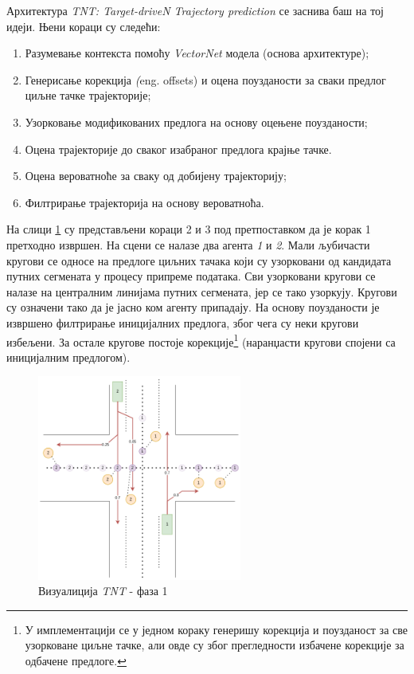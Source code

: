 \documentclass[11pt,oneside]{memoir}
\begin{document}
Архитектура \textit{TNT: Target-driveN Trajectory prediction} \cite{tnt} се заснива баш на тој идеји. Њени кораци су следећи:
\begin{enumerate}
  \item Разумевање контекста помоћу \textit{VectorNet} модела (основа архитектуре);
  \item Генерисање корекција \textit(eng. offsets) и оцена поузданости за сваки предлог циљне тачке трајекторије;
  \item Узорковање модификованих предлога на основу оцењене поузданости;
  \item Оцена трајекторије до сваког изабраног предлога крајње тачке.
  \item Оцена вероватноће за сваку од добијену трајекторију;
  \item Филтрирање трајекторија на основу вероватноћа.
\end{enumerate}

На слици \ref{tnt-viz-1} су представљени кораци 2 и 3 под претпоставком да је корак 1 претходно извршен. На сцени се налазе два агента
\textit{1} и \textit{2}. Мали љубичасти кругови се односе на предлоге циљних тачака који су узорковани од кандидата путних сегмената у процесу припреме података.
Сви узорковани кругови се налазе на централним линијама путних сегмената, јер се тако узоркују. Кругови су означени тако да је јасно ком агенту припадају. На основу поузданости је 
извршено филтрирање иницијалних предлога, због чега су неки кругови избељени. За остале кругове постоје корекције\footnote{
  У имплементацији се у једном кораку генеришу корекција и поузданост за све узорковане циљне тачке, али овде су због прегледности
  избачене корекције за одбачене предлоге.
} (наранџасти кругови спојени са иницијалним предлогом).


\begin{figure}[H]
  \centering
  \includegraphics[width=0.6\textwidth]{images/tnt-viz-Page-1.drawio.png}
  \caption{Визуалиција \textit{TNT} - фаза 1 \label{tnt-viz-1}}
\end{figure}
\end{document}
